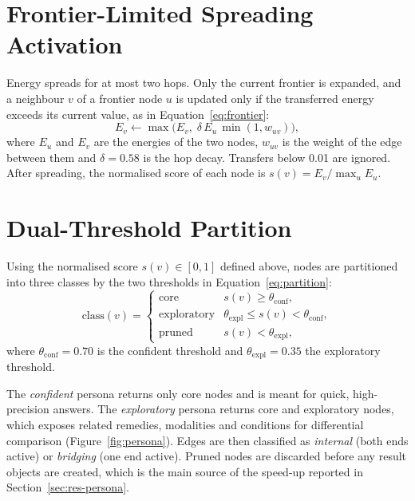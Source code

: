 \documentclass[12pt,a4paper,oneside]{report}
\begin{document}
\section{Frontier-Limited Spreading Activation}
Energy spreads for at most two hops. Only the current frontier is expanded, and a neighbour $v$ of a frontier node $u$ is updated only if the transferred energy exceeds its current value, as in Equation~\eqref{eq:frontier}:
\begin{equation}
  E_v \leftarrow \max\big(E_v,\; \delta\, E_u\, \min(1, w_{uv})\big),
  \label{eq:frontier}
\end{equation}
where $E_u$ and $E_v$ are the energies of the two nodes, $w_{uv}$ is the weight of the edge between them and $\delta = 0.58$ is the hop decay. Transfers below 0.01 are ignored. After spreading, the normalised score of each node is $s(v) = E_v / \max_{u} E_u$.

\section{Dual-Threshold Partition}
Using the normalised score $s(v) \in [0,1]$ defined above, nodes are partitioned into three classes by the two thresholds in Equation~\eqref{eq:partition}:
\begin{equation}
  \text{class}(v) = \begin{cases}
  \text{core} & s(v) \ge \theta_{\text{conf}},\\
  \text{exploratory} & \theta_{\text{expl}} \le s(v) < \theta_{\text{conf}},\\
  \text{pruned} & s(v) < \theta_{\text{expl}},
  \end{cases}
  \label{eq:partition}
\end{equation}
where $\theta_{\text{conf}} = 0.70$ is the confident threshold and $\theta_{\text{expl}} = 0.35$ the exploratory threshold.

The \emph{confident} persona returns only core nodes and is meant for quick, high-precision answers. The \emph{exploratory} persona returns core and exploratory nodes, which exposes related remedies, modalities and conditions for differential comparison (Figure~\ref{fig:persona}). Edges are then classified as \emph{internal} (both ends active) or \emph{bridging} (one end active). Pruned nodes are discarded before any result objects are created, which is the main source of the speed-up reported in Section~\ref{sec:res-persona}.
\end{document}

